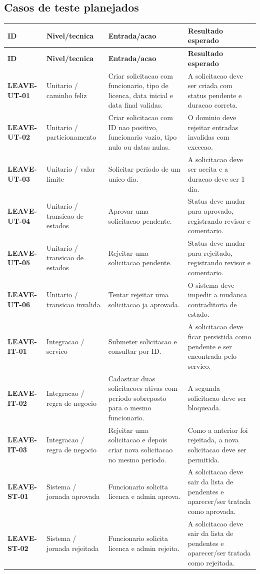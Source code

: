\documentclass[12pt,a4paper]{article}
\newcommand{\Caso}[1]{\textbf{#1}}
\begin{document}
\newpage
\subsection{Casos de teste planejados}

\begin{longtable}{p{2.4cm}p{2.9cm}p{4.5cm}p{4.6cm}}
\toprule
\textbf{ID} & \textbf{Nivel/tecnica} & \textbf{Entrada/acao} & \textbf{Resultado esperado} \\
\midrule
\endfirsthead
\toprule
\textbf{ID} & \textbf{Nivel/tecnica} & \textbf{Entrada/acao} & \textbf{Resultado esperado} \\
\midrule
\endhead
\Caso{LEAVE-UT-01} & Unitario / caminho feliz & Criar solicitacao com funcionario, tipo de licenca, data inicial e data final validas. & A solicitacao deve ser criada com status pendente e duracao correta. \\
\Caso{LEAVE-UT-02} & Unitario / particionamento & Criar solicitacao com ID nao positivo, funcionario vazio, tipo nulo ou datas nulas. & O dominio deve rejeitar entradas invalidas com excecao. \\
\Caso{LEAVE-UT-03} & Unitario / valor limite & Solicitar periodo de um unico dia. & A solicitacao deve ser aceita e a duracao deve ser 1 dia. \\
\Caso{LEAVE-UT-04} & Unitario / transicao de estados & Aprovar uma solicitacao pendente. & Status deve mudar para aprovado, registrando revisor e comentario. \\
\Caso{LEAVE-UT-05} & Unitario / transicao de estados & Rejeitar uma solicitacao pendente. & Status deve mudar para rejeitado, registrando revisor e comentario. \\
\Caso{LEAVE-UT-06} & Unitario / transicao invalida & Tentar rejeitar uma solicitacao ja aprovada. & O sistema deve impedir a mudanca contraditoria de estado. \\
\Caso{LEAVE-IT-01} & Integracao / servico & Submeter solicitacao e consultar por ID. & A solicitacao deve ficar persistida como pendente e ser encontrada pelo servico. \\
\Caso{LEAVE-IT-02} & Integracao / regra de negocio & Cadastrar duas solicitacoes ativas com periodo sobreposto para o mesmo funcionario. & A segunda solicitacao deve ser bloqueada. \\
\Caso{LEAVE-IT-03} & Integracao / regra de negocio & Rejeitar uma solicitacao e depois criar nova solicitacao no mesmo periodo. & Como a anterior foi rejeitada, a nova solicitacao deve ser permitida. \\
\Caso{LEAVE-ST-01} & Sistema / jornada aprovada & Funcionario solicita licenca e admin aprova. & A solicitacao deve sair da lista de pendentes e aparecer/ser tratada como aprovada. \\
\Caso{LEAVE-ST-02} & Sistema / jornada rejeitada & Funcionario solicita licenca e admin rejeita. & A solicitacao deve sair da lista de pendentes e aparecer/ser tratada como rejeitada. \\
\bottomrule
\end{longtable}
\end{document}
